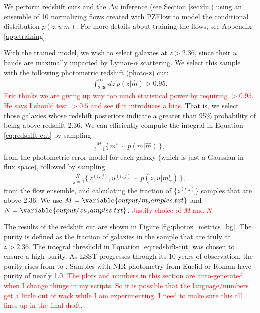 \documentclass[twocolumn]{aastex631}
\newcommand{\note}[1]{\textsf{\textcolor{red}{#1}}\xspace}
\newcommand{\lya}{Lyman-$\alpha$\xspace}
\newcommand{\du}{\Delta u}
\begin{document}
We perform redshift cuts and the $\du$ inference (see Section \ref{sec:du}) using an ensemble of 10 normalizing flows created with PZFlow \citep{pzflow} to model the conditional distribution $p(z, u | m)$.
For more details about training the flows, see Appendix \ref{app:training}.

With the trained model, we wish to select galaxies at $z > 2.36$, since their $u$ bands are maximally impacted by \lya scattering.
We select this sample with the following photometric redshift (photo-z) cut:
\begin{align}
    \int_{2.36}^\infty dz ~ p(z|\hat{m}) > 0.95.
    \label{eq:redshift-cut}
\end{align}
\note{Eric thinks we are giving up way too much statistical power by requiring $> 0.95$. He says I should test $>0.5$ and see if it introduces a bias.}
That is, we select those galaxies whose redshift posteriors indicate a greater than 95\% probability of being above redshift 2.36.
We can efficiently compute the integral in Equation \ref{eq:redshift-cut} by sampling
\begin{align}
    _{i=1}^{~~ M} \{ \, m^i \sim p(m | \hat{m}) \, \},
\end{align}
from the photometric error model for each galaxy (which is just a Gaussian in flux space), followed by sampling
\begin{align}
    _{j=1}^{~~ N} \{ \, z^{(i,\, j)}, u^{(i,\, j)} \sim p(z, u | m_\alpha^i) \, \},
    \label{eq:samples}
\end{align}
from the flow ensemble, and calculating the fraction of $\{ z^{(i, j)} \}$ samples that are above 2.36.
We use $M=\variable{output/m_samples.txt}$ and $N=\variable{output/zu_samples.txt}$.
\note{Justify choice of $M$ and $N$.}

The results of the redshift cut are shown in Figure \ref{fig:photoz_metrics_bg}.
The purity is defined as the fraction of galaxies in the sample that are truly at $z > 2.36$.
The integral threshold in Equation \ref{eq:redshift-cut} was chosen to ensure a high purity.
As LSST progresses through its 10 years of observation, the purity rises from  to .
Samples with NIR photometry from Euclid or Roman have purity of nearly 1.0.
\note{The plots and numbers in this section are auto-generated when I change things in my scripts. So it is possible that the language/numbers get a little out of wack while I am experimenting. I need to make sure this all lines up in the final draft.}
\end{document}
